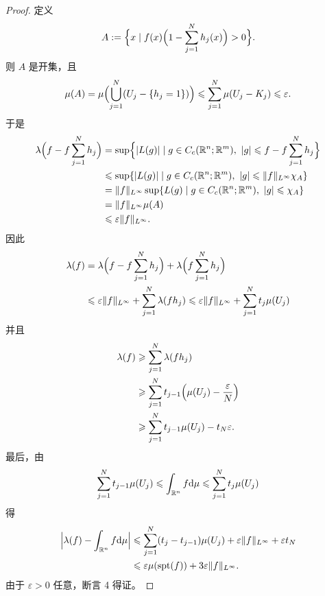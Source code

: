 \documentclass[../../main.tex]{subfiles}%
\begin{document}
\begin{proof}
定义
\begin{align*}
A:=\Bigl\{x\mid f(x)\Bigl(1-\sum_{j=1}^{N}h_j(x)\Bigr)>0\Bigr\}.
\end{align*}
则 $A$ 是开集，且
\begin{align*}
\mu(A)=\mu\Bigl(\bigcup_{j=1}^{N}(U_j-\{h_j=1\})\Bigr)\leqslant\sum_{j=1}^{N}\mu(U_j-K_j)\leqslant\varepsilon.
\end{align*}
于是
\begin{align*}
\lambda\Bigl(f-f\sum_{j=1}^{N}h_j\Bigr)
&=\sup\Bigl\{\lvert L(g)\rvert\mid g\in C_c(\mathbb{R}^n;\mathbb{R}^m),\ \lvert g\rvert\leqslant f-f\sum_{j=1}^{N}h_j\Bigr\}\\
&\leqslant\sup\{\lvert L(g)\rvert\mid g\in C_c(\mathbb{R}^n;\mathbb{R}^m),\ \lvert g\rvert\leqslant\lVert f\rVert_{L^{\infty}}\chi_A\}\\
&=\lVert f\rVert_{L^{\infty}}\sup\{L(g)\mid g\in C_c(\mathbb{R}^n;\mathbb{R}^m),\ \lvert g\rvert\leqslant\chi_A\}\\
&=\lVert f\rVert_{L^{\infty}}\mu(A)\\
&\leqslant\varepsilon\lVert f\rVert_{L^{\infty}}.
\end{align*}
因此
\begin{align*}
\lambda(f)&=\lambda\Bigl(f-f\sum_{j=1}^{N}h_j\Bigr)+\lambda\Bigl(f\sum_{j=1}^{N}h_j\Bigr)\\
&\leqslant\varepsilon\lVert f\rVert_{L^{\infty}}+\sum_{j=1}^{N}\lambda(fh_j)
\leqslant\varepsilon\lVert f\rVert_{L^{\infty}}+\sum_{j=1}^{N}t_j\mu(U_j)
\end{align*}
并且
\begin{align*}
\lambda(f)&\geqslant\sum_{j=1}^{N}\lambda(fh_j)\\
&\geqslant\sum_{j=1}^{N}t_{j-1}\Bigl(\mu(U_j)-\frac{\varepsilon}{N}\Bigr)\\
&\geqslant\sum_{j=1}^{N}t_{j-1}\mu(U_j)-t_N\varepsilon.
\end{align*}
最后，由
\begin{align*}
\sum_{j=1}^{N}t_{j-1}\mu(U_j)\leqslant\int_{\mathbb{R}^n}f\mathrm{d}\mu\leqslant\sum_{j=1}^{N}t_j\mu(U_j)
\end{align*}
得
\begin{align*}
\Bigl\lvert\lambda(f)-\int_{\mathbb{R}^n}f\mathrm{d}\mu\Bigr\rvert
&\leqslant\sum_{j=1}^{N}(t_j-t_{j-1})\mu(U_j)+\varepsilon\lVert f\rVert_{L^{\infty}}+\varepsilon t_N\\
&\leqslant\varepsilon\mu(\operatorname{spt}(f))+3\varepsilon\lVert f\rVert_{L^{\infty}}.
\end{align*}
由于 $\varepsilon>0$ 任意，断言 4 得证。


\end{proof}
\end{document}

